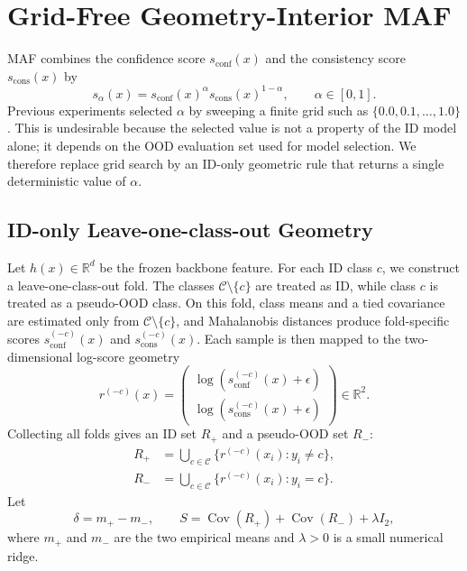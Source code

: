 
\section{Grid-Free Geometry-Interior MAF}
\label{sec:geometry_calibrated_maf}

MAF combines the confidence score $s_{\mathrm{conf}}(x)$ and the consistency
score $s_{\mathrm{cons}}(x)$ by
\begin{equation}
    s_{\alpha}(x)
    =
    s_{\mathrm{conf}}(x)^{\alpha}
    s_{\mathrm{cons}}(x)^{1-\alpha},
    \qquad
    \alpha \in [0,1].
\end{equation}
Previous experiments selected $\alpha$ by sweeping a finite grid such as
$\{0.0,0.1,\ldots,1.0\}$.  This is undesirable because the selected value is
not a property of the ID model alone; it depends on the OOD evaluation set used
for model selection.  We therefore replace grid search by an ID-only geometric
rule that returns a single deterministic value of $\alpha$.

\subsection{ID-only Leave-one-class-out Geometry}

Let $h(x)\in\mathbb{R}^{d}$ be the frozen backbone feature.  For each ID class
$c$, we construct a leave-one-class-out fold.  The classes
$\mathcal{C}\setminus\{c\}$ are treated as ID, while class $c$ is treated as a
pseudo-OOD class.  On this fold, class means and a tied covariance are estimated
only from $\mathcal{C}\setminus\{c\}$, and Mahalanobis distances produce
fold-specific scores
$s_{\mathrm{conf}}^{(-c)}(x)$ and $s_{\mathrm{cons}}^{(-c)}(x)$.
Each sample is then mapped to the two-dimensional log-score geometry
\begin{equation}
    r^{(-c)}(x)
    =
    \begin{pmatrix}
        \log(s_{\mathrm{conf}}^{(-c)}(x)+\epsilon) \\
        \log(s_{\mathrm{cons}}^{(-c)}(x)+\epsilon)
    \end{pmatrix}
    \in \mathbb{R}^{2}.
\end{equation}
Collecting all folds gives an ID set $R_{+}$ and a pseudo-OOD set $R_{-}$:
\begin{align}
    R_{+}
    &=
    \bigcup_{c\in\mathcal{C}}
    \{r^{(-c)}(x_i): y_i\neq c\},\\
    R_{-}
    &=
    \bigcup_{c\in\mathcal{C}}
    \{r^{(-c)}(x_i): y_i=c\}.
\end{align}
Let
\begin{equation}
    \delta = m_{+}-m_{-},
    \qquad
    S = \operatorname{Cov}(R_{+})+\operatorname{Cov}(R_{-})+\lambda I_{2},
\end{equation}
where $m_{+}$ and $m_{-}$ are the two empirical means and $\lambda>0$ is a small
numerical ridge.

